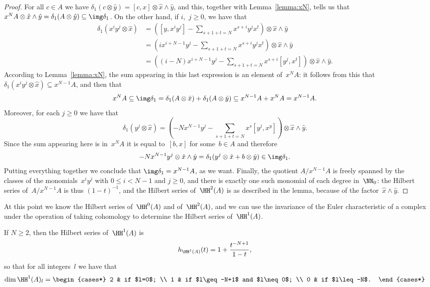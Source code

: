 \begin{proof}\allowdisplaybreaks
For all $c\in A$ we have $\delta_1(c\otimes\hat y)=[c,x]\otimes\hat
x\wedge\hat y$, and this, together with Lemma~\ref{lemma:xN}, tells us that
$x^NA\otimes\hat x\wedge\hat y=\delta_1(A\otimes\hat
y)\subseteq\img\delta_1$. On the other hand, if $i$,~$j\geq0$, we have that
  \begin{align}
  \delta_1(x^iy^j\otimes\hat x)
        &= \left([y,x^iy^j] - \sum_{s+1+t=N}x^{s+i}y^jx^t\right)
           \otimes\hat x\wedge\hat y \\
        &= \left(ix^{i+N-1}y^j - \sum_{s+1+t=N}x^{s+i}y^jx^t\right)
           \otimes\hat x\wedge\hat y \\
        &= \left((i-N)x^{i+N-1}y^j - \sum_{s+1+t=N}x^{s+i}[y^j,x^t] \right)
           \otimes\hat x\wedge\hat y. 
  \end{align}
According to Lemma~\ref{lemma:xN}, the sum appearing in this last
expression is an element of~$x^NA$: it follows from this that
$\delta_1(x^iy^j\otimes\hat x)\subseteq x^{N-1}A$, and then that
  \[
  x^NA 
        \subseteq \img\delta_1 
        = \delta_1(A\otimes\hat x)+\delta_1(A\otimes\hat y)
        \subseteq x^{N-1}A + x^{N}A = x^{N-1}A.
  \]
Moreover, for each $j\geq0$ we have that
  \[
  \delta_1(y^j\otimes\hat x)
        = \left(-Nx^{N-1}y^j - \sum_{s+1+t=N}x^s[y^j,x^y] \right)
           \otimes\hat x\wedge\hat y.
  \]
Since the sum appearing here is in~$x^NA$ it is equal to~$[b,x]$ for
some~$b\in A$ and therefore
  \[
  -Nx^{N-1}y^j\otimes\hat x\wedge\hat y = \delta_1(y^j\otimes\hat x+b\otimes\hat y) 
        \in \img\delta_1.
  \]
Putting everything together we conclude that $\img\delta_1=x^{N-1}A$, as
we want. Finally, the quotient $A/x^{N-1}A$ is freely spanned by the
classes of the monomials~$x^iy^j$ with $0\leq i<N-1$ and $j\geq0$, and
there is exactly one such monomial of each degree in~$\NN_0$: the Hilbert
series of~$A/x^{N-1}A$ is thus $(1-t)^{-1}$, and the Hilbert series
of~$\HH^2(A)$ is as described in the lemma, because of the factor~$\hat
x\wedge\hat y$.
\end{proof}

At this point we know the Hilbert series of~$\HH^0(A)$ and of~$\HH^2(A)$,
and we can use the invariance of the Euler characteristic of a complex
under the operation of taking cohomology to determine the Hilbert series
of~$\HH^1(A)$.

\begin{Proposition}\label{prop:hh1-series}
If $N\geq2$, then
the Hilbert series of~$\HH^1(A)$ is
  \[
  h_{\HH^1(A)}(t) = 1 + \frac{t^{-N+1}}{1-t},
  \]
so that for all integers~$l$ we have that
  \[
  \dim\HH^1(A)_l =
    \begin{cases*}
    2 & if $l=0$; \\
    1 & if $l\geq-N+1$ and $l\neq0$; \\
    0 & if $l\leq -N$.
    \end{cases*}
  \]
\end{Proposition}

